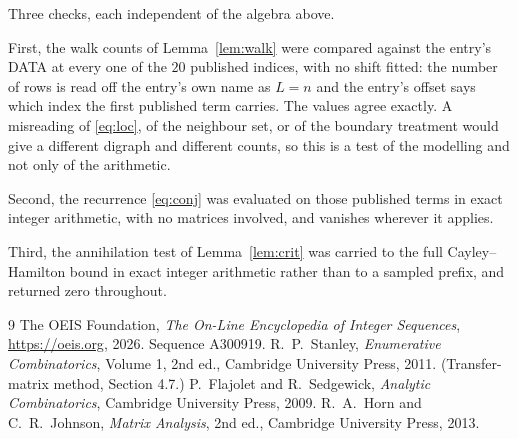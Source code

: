 \documentclass[11pt,a4paper]{article}
\theoremstyle{plain}
\theoremstyle{definition}
\begin{document}
Three checks, each independent of the algebra above.

First, the walk counts of Lemma~\ref{lem:walk} were compared against the entry's DATA at
every one of the $20$ published indices, with no shift fitted: the number of rows is
read off the entry's own name as $L=n$ and the entry's offset says which index the first
published term carries. The values agree exactly. A misreading of \eqref{eq:loc}, of the
neighbour set, or of the boundary treatment would give a different digraph and different
counts, so this is a test of the modelling and not only of the arithmetic.

Second, the recurrence \eqref{eq:conj} was evaluated on those published terms in exact
integer arithmetic, with no matrices involved, and vanishes wherever it applies.

Third, the annihilation test of Lemma~\ref{lem:crit} was carried to the full
Cayley--Hamilton bound in exact integer arithmetic rather than to a sampled prefix, and
returned zero throughout.

\begin{thebibliography}{9}
 The OEIS Foundation, \emph{The On-Line Encyclopedia of Integer
Sequences}, \url{https://oeis.org}, 2026. Sequence A300919.
 R.~P.~Stanley, \emph{Enumerative Combinatorics}, Volume 1, 2nd ed.,
Cambridge University Press, 2011. (Transfer-matrix method, Section 4.7.)
 P.~Flajolet and R.~Sedgewick, \emph{Analytic Combinatorics}, Cambridge
University Press, 2009.
 R.~A.~Horn and C.~R.~Johnson, \emph{Matrix Analysis}, 2nd ed., Cambridge
University Press, 2013.
\end{thebibliography}
\end{document}
